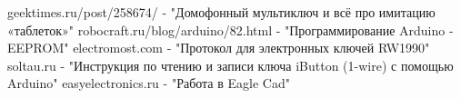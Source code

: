 \newpage


\begin{thebibliography}{}
	   geektimes.ru/post/258674/  -  "Домофонный мультиключ и всё про имитацию «таблеток»"
	  robocraft.ru/blog/arduino/82.html  -  "Программирование Arduino - EEPROM"
	  electromost.com  -  "Протокол для электронных ключей RW1990"
	  soltau.ru  -  "Инструкция по чтению и записи ключа iButton (1-wire) с помощью Arduino"
	  easyelectronics.ru -  "Работа в Eagle Cad"
\end{thebibliography}


